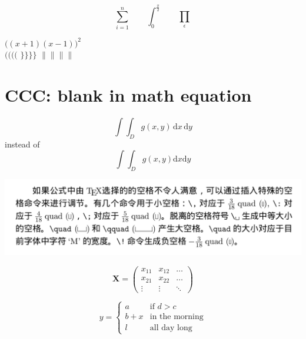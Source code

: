\documentclass{article}
\begin{document}

\begin{displaymath}
\sum_{i=1}^{n} \qquad
\int_{0}^{\frac{\pi}{2}} \qquad
\prod_\epsilon
\end{displaymath}

$\Big( (x+1) (x-1) \Big) ^{2}$\\
$\big(\Big(\bigg(\Bigg($\quad
$\big\}\Big\}\bigg\}\Bigg\}$\quad
$\big\|\Big\|\bigg\|\Bigg\|$


\section{CCC: blank in math equation}

\newcommand{\ud}{\mathrm{d}}
\begin{displaymath}
\int\!\!\!\int_{D} g(x,y)
\, \ud x\, \ud y
\end{displaymath}
instead of
\begin{displaymath}
\int\int_{D} g(x,y)\ud x \ud y
\end{displaymath}


\begin{center}
\includegraphics[scale=0.25]{lshort_ch3.png}
\end{center}

\begin{displaymath}
\mathbf{X} =
\left( \begin{array}{ccc}
x_{11} & x_{12} & \ldots \\
x_{21} & x_{22} & \ldots \\
\vdots & \vdots & \ddots
\end{array} \right)
\end{displaymath}


\begin{displaymath}
y = \left\{ \begin{array}{ll}
a & \textrm{if $d>c$}\\
b+x & \textrm{in the morning}\\
l & \textrm{all day long}
\end{array} \right.
\end{displaymath}
\end{document}
